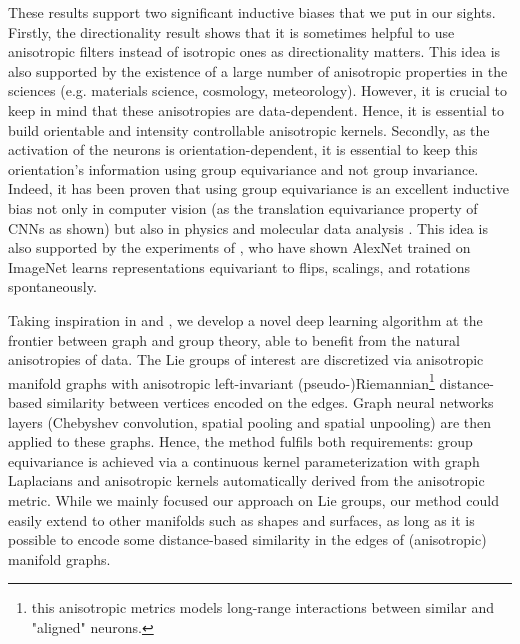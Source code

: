 \documentclass{article}
\begin{document}
These results support two significant inductive biases that we put in our sights. Firstly, the directionality result shows that it is sometimes helpful to use anisotropic filters instead of isotropic ones as directionality matters. This idea is also supported by the existence of a large number of anisotropic properties in the sciences (e.g. materials science, cosmology, meteorology). However, it is crucial to keep in mind that these anisotropies are data-dependent. Hence, it is essential to build orientable and intensity controllable anisotropic kernels. Secondly, as the activation of the neurons is orientation-dependent, it is essential to keep this orientation's information using group equivariance and not group invariance. Indeed, it has been proven that using group equivariance is an excellent inductive bias not only in computer vision (as the translation equivariance property of CNNs as shown) but also in physics \citep{finzi2020generalizing} and molecular data analysis \citep{fuchs2021iterative, 
jumper2020high}. This idea is also supported by the experiments of \citet{lenc2015understanding}, who have shown AlexNet \citet{krizhevsky2012imagenet} trained on ImageNet learns representations equivariant to flips, scalings, and rotations spontaneously. 

Taking inspiration in \citet{defferrard2020deepsphere} and \citet{bekkers2019b}, we develop a novel deep learning algorithm at the frontier between graph and group theory, able to benefit from the natural anisotropies of data. The Lie groups of interest are discretized via anisotropic manifold graphs with anisotropic left-invariant (pseudo-)Riemannian\footnote{this anisotropic metrics models long-range interactions between similar and "aligned" neurons.} distance-based similarity between vertices encoded on the edges. Graph neural networks layers (Chebyshev convolution, spatial pooling and spatial unpooling) are then applied to these graphs. Hence, the method fulfils both requirements: group equivariance is achieved via a continuous kernel parameterization with graph Laplacians and anisotropic kernels automatically derived from the anisotropic metric. While we mainly focused our approach on Lie groups, our method could easily extend to other manifolds such as shapes and surfaces, as long as it is possible to encode some distance-based similarity in the edges of (anisotropic) manifold graphs.
\end{document}
